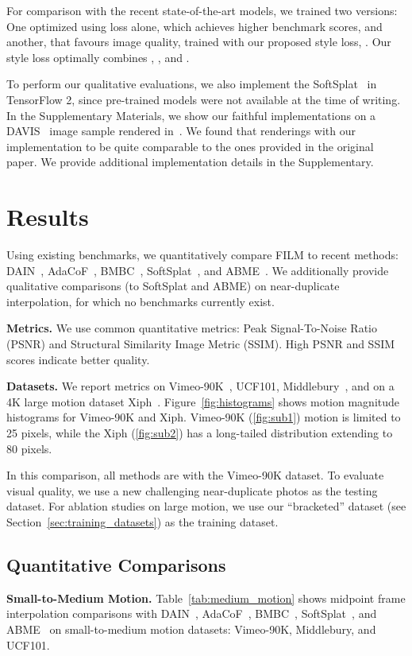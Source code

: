 \documentclass[runningheads]{llncs}
\newcommand{\Table}[1]{Table~\ref{tab:#1}}
\begin{document}
For comparison with the recent state-of-the-art models, we trained two versions: One optimized using  loss alone, which achieves higher benchmark scores, and another, that favours image quality, trained with our proposed style loss, . Our style loss optimally combines , , and . 

To perform our qualitative evaluations, we also implement the SoftSplat~\cite{softsplat-2020} in TensorFlow 2, since pre-trained models were not available at the time of writing. In the Supplementary Materials, we show our faithful implementations on a DAVIS~\cite{DAVIS} image sample rendered in~\cite{softsplat-2020}. We found that renderings with our implementation to be quite comparable to the ones provided in the original paper. We provide additional implementation details in the Supplementary.
 \section{Results}
\label{sec:results}
Using existing benchmarks, we quantitatively compare FILM to recent methods: DAIN~\cite{dain-2019}, AdaCoF~\cite{adacof-2020}, BMBC~\cite{bmbc-2021}, SoftSplat~\cite{softsplat-2020}, and ABME~\cite{abme-2021}.  We additionally provide qualitative comparisons (to SoftSplat and ABME) on near-duplicate interpolation, for which no benchmarks currently exist.


\vspace{0.05in}
\noindent\textbf{Metrics.} We use common quantitative metrics: Peak Signal-To-Noise Ratio (PSNR) and Structural Similarity Image Metric (SSIM). High PSNR and SSIM scores indicate better quality.

\vspace{0.05in}
\noindent\textbf{Datasets.} 
We report metrics on Vimeo-90K~\cite{vimeo}, UCF101\cite{ucf101}, Middlebury~\cite{middlebury}, and on a 4K large motion dataset Xiph~\cite{xiph,softsplat-2020}. 
Figure~\ref{fig:histograms} shows motion magnitude histograms for Vimeo-90K and Xiph. Vimeo-90K (\ref{fig:sub1}) motion is limited to 25 pixels, while the Xiph (\ref{fig:sub2}) has a long-tailed distribution extending to 80 pixels.

In this comparison, all methods are with the Vimeo-90K dataset. To evaluate visual quality, we use a new challenging near-duplicate photos as the testing dataset. For ablation studies on large motion, we use our ``bracketed'' dataset (see Section~\ref{sec:training_datasets}) as the training dataset.

\subsection{Quantitative Comparisons}
\label{sec:quantitative_comparisons}
\vspace{0.05in}
\noindent\textbf{Small-to-Medium Motion.} \Table{medium_motion} shows midpoint frame interpolation comparisons with DAIN~\cite{dain-2019}, AdaCoF~\cite{adacof-2020}, BMBC~\cite{bmbc-2021}, SoftSplat~\cite{softsplat-2020}, and ABME~\cite{abme-2021} on small-to-medium motion datasets: Vimeo-90K, Middlebury, and UCF101. 
\end{document}
